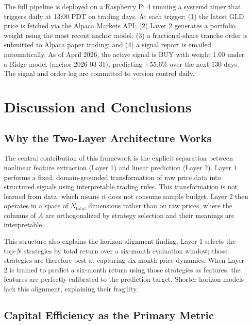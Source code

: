 \documentclass[11pt, letterpaper]{article}
\begin{document}
The full pipeline is deployed on a Raspberry Pi 4 running a systemd timer
that triggers daily at 13:00 PDT on trading days. At each trigger: (1) the
latest GLD price is fetched via the Alpaca Markets API; (2) Layer 2 generates
a portfolio weight using the most recent anchor model; (3) a fractional-share
tranche order is submitted to Alpaca paper trading; and (4) a signal report
is emailed automatically. As of April 2026, the active signal is BUY with
weight 1.00 under a Ridge model (anchor 2026-03-31), predicting $+$55.6\%
over the next 130 days. The signal and order log are committed to version
control daily.

\section{Discussion and Conclusions}

\subsection{Why the Two-Layer Architecture Works}

The central contribution of this framework is the explicit separation between
nonlinear feature extraction (Layer 1) and linear prediction (Layer 2). Layer
1 performs a fixed, domain-grounded transformation of raw price data into
structured signals using interpretable trading rules. This transformation
is not learned from data, which means it does not consume sample budget. Layer 2 then operates in a space of $N_{\text{total}}$
dimensions rather than on raw prices, where the columns of $A$ are
orthogonalized by strategy selection and their meanings are interpretable.

This structure also explains the horizon alignment finding. Layer 1 selects
the top-$N$ strategies by total return over a six-month evaluation window;
those strategies are therefore best at capturing six-month price dynamics.
When Layer 2 is trained to predict a six-month return using those strategies
as features, the features are perfectly calibrated to the prediction target.
Shorter-horizon models lack this alignment, explaining their fragility.

\subsection{Capital Efficiency as the Primary Metric}
\end{document}
